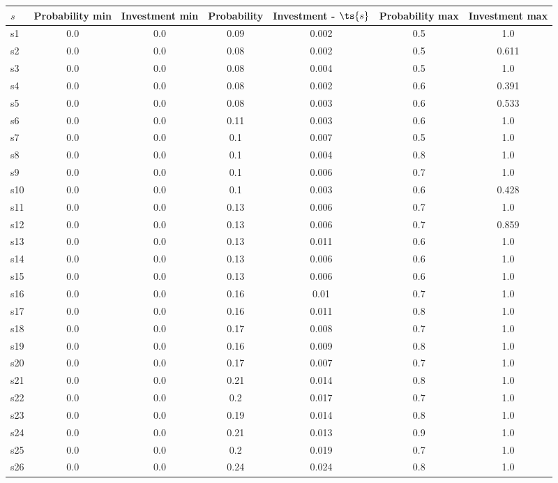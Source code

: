 \documentclass{article}
\begin{document}
\noindent\begin{tabular}{|l|c|c|c|c|c|c|}
\hline
$s$& Probability min & Investment min & Probability & Investment - $\ts{s}$ & Probability max & Investment max\\
\hline
s1 &0.0 & 0.0 & 0.09 & 0.002 & 0.5 & 1.0\\
\hline
s2 &0.0 & 0.0 & 0.08 & 0.002 & 0.5 & 0.611\\
\hline
s3 &0.0 & 0.0 & 0.08 & 0.004 & 0.5 & 1.0\\
\hline
s4 &0.0 & 0.0 & 0.08 & 0.002 & 0.6 & 0.391\\
\hline
s5 &0.0 & 0.0 & 0.08 & 0.003 & 0.6 & 0.533\\
\hline
s6 &0.0 & 0.0 & 0.11 & 0.003 & 0.6 & 1.0\\
\hline
s7 &0.0 & 0.0 & 0.1 & 0.007 & 0.5 & 1.0\\
\hline
s8 &0.0 & 0.0 & 0.1 & 0.004 & 0.8 & 1.0\\
\hline
s9 &0.0 & 0.0 & 0.1 & 0.006 & 0.7 & 1.0\\
\hline
s10 &0.0 & 0.0 & 0.1 & 0.003 & 0.6 & 0.428\\
\hline
s11 &0.0 & 0.0 & 0.13 & 0.006 & 0.7 & 1.0\\
\hline
s12 &0.0 & 0.0 & 0.13 & 0.006 & 0.7 & 0.859\\
\hline
s13 &0.0 & 0.0 & 0.13 & 0.011 & 0.6 & 1.0\\
\hline
s14 &0.0 & 0.0 & 0.13 & 0.006 & 0.6 & 1.0\\
\hline
s15 &0.0 & 0.0 & 0.13 & 0.006 & 0.6 & 1.0\\
\hline
s16 &0.0 & 0.0 & 0.16 & 0.01 & 0.7 & 1.0\\
\hline
s17 &0.0 & 0.0 & 0.16 & 0.011 & 0.8 & 1.0\\
\hline
s18 &0.0 & 0.0 & 0.17 & 0.008 & 0.7 & 1.0\\
\hline
s19 &0.0 & 0.0 & 0.16 & 0.009 & 0.8 & 1.0\\
\hline
s20 &0.0 & 0.0 & 0.17 & 0.007 & 0.7 & 1.0\\
\hline
s21 &0.0 & 0.0 & 0.21 & 0.014 & 0.8 & 1.0\\
\hline
s22 &0.0 & 0.0 & 0.2 & 0.017 & 0.7 & 1.0\\
\hline
s23 &0.0 & 0.0 & 0.19 & 0.014 & 0.8 & 1.0\\
\hline
s24 &0.0 & 0.0 & 0.21 & 0.013 & 0.9 & 1.0\\
\hline
s25 &0.0 & 0.0 & 0.2 & 0.019 & 0.7 & 1.0\\
\hline
s26 &0.0 & 0.0 & 0.24 & 0.024 & 0.8 & 1.0\\

\end{tabular}
\end{document}
